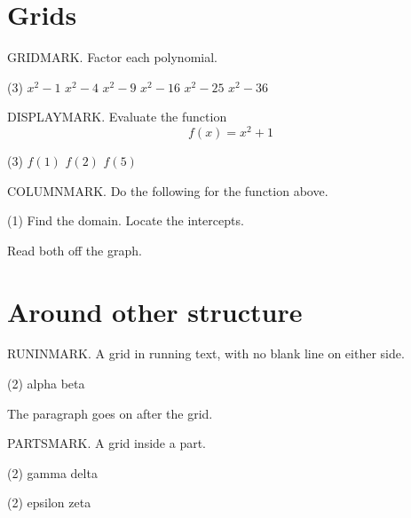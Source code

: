 \documentclass{didactic}
\begin{document}
\section{Grids}

\begin{exercise}
	GRIDMARK. Factor each polynomial.
	\begin{tasks}(3)
		\task $x^2 - 1$
		\task $x^2 - 4$
		\task $x^2 - 9$
		\task $x^2 - 16$
		\task $x^2 - 25$
		\task $x^2 - 36$
	\end{tasks}
\end{exercise}

\begin{exercise}
	DISPLAYMARK. Evaluate the function
	\[
		f(x) = x^2 + 1
	\]
	\begin{tasks}(3)
		\task $f(1)$
		\task $f(2)$
		\task $f(5)$
	\end{tasks}
\end{exercise}

\begin{example}
	COLUMNMARK. Do the following for the function above.
	\begin{tasks}(1)
		\task Find the domain.
		\task Locate the intercepts.
	\end{tasks}

	\solution Read both off the graph.
\end{example}

\section{Around other structure}

RUNINMARK. A grid in running text, with no blank line on either side.
\begin{tasks}(2)
	\task alpha
	\task beta
\end{tasks}
The paragraph goes on after the grid.

\begin{exercise}
	\begin{parts}
		\item PARTSMARK. A grid inside a part.
		\begin{tasks}(2)
			\task gamma
			\task delta
		\end{tasks}
		\item
		\begin{tasks}(2)
			\task epsilon
			\task zeta
		\end{tasks}
	\end{parts}
\end{exercise}
\end{document}
